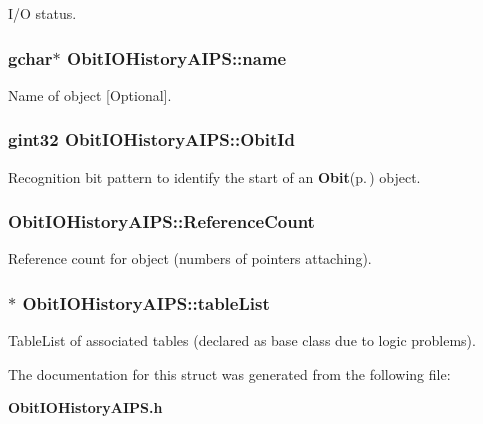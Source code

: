 I/O status. 

\subsubsection{\setlength{\rightskip}{0pt plus 5cm}gchar$\ast$ {\bf Obit\-IOHistory\-AIPS::name}}\label{structObitIOHistoryAIPS_o3}


Name of object [Optional]. 

\subsubsection{\setlength{\rightskip}{0pt plus 5cm}gint32 {\bf Obit\-IOHistory\-AIPS::Obit\-Id}}\label{structObitIOHistoryAIPS_o0}


Recognition bit pattern to identify the start of an {\bf Obit}{\rm (p.\,\pageref{structObit})} object. 

\subsubsection{ {\bf Obit\-IOHistory\-AIPS::Reference\-Count}}\label{structObitIOHistoryAIPS_o2}


Reference count for object (numbers of pointers attaching). 

\subsubsection{$\ast$ {\bf Obit\-IOHistory\-AIPS::table\-List}}\label{structObitIOHistoryAIPS_o9}


Table\-List of associated tables (declared as base class due to logic problems). 



The documentation for this struct was generated from the following file:\begin{CompactItemize}
\item 
{\bf Obit\-IOHistory\-AIPS.h}\end{CompactItemize}
